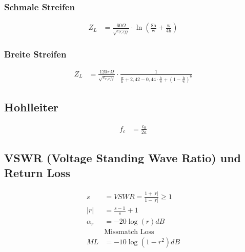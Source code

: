 \subsubsection{Schmale Streifen}
\begin{align*}
    Z_L & = \frac{60\Omega}{\sqrt{\varepsilon_{r,eff}}}\cdot\ln\left(\frac{8\text{h}}{\text{w}}+\frac{\text{w}}{4\text{h}}\right)
\end{align*}
\subsubsection{Breite Streifen}
\begin{align*}
    Z_L & = \frac{120\pi\Omega}{\sqrt{\varepsilon_{r,eff}}}\cdot\frac{1}{\frac{\text{w}}{\text{h}}+2,42-0,44\cdot\frac{\text{h}}{\text{w}}+\left(1-\frac{\text{h}}{\text{w}}\right)^6}
\end{align*}

\subsection{Hohlleiter}
\begin{align*}
    f_c & = \frac{c_0}{2a}
\end{align*}

\subsection{VSWR (Voltage Standing Wave Ratio) und Return Loss}
\begin{align*}
    s        & = VSWR = \frac{1+|r|}{1-|r|}\geq 1 \\
    |r|      & = \frac{s-1}s+{1}                  \\
    \alpha_r & = -20\log(r)dB                     \\
             & \text{Missmatch Loss}              \\
    ML       & = -10\log(1-r^2)dB
\end{align*}